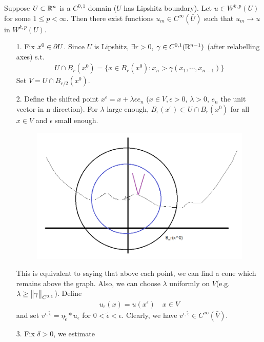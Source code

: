 \documentclass[12pt,a4paper]{report}
\newenvironment{proof}
{\begin{changemargin}{1cm}{0.5cm} 
	}%
	{\end{changemargin}
}
\begin{document}
\thm Suppose $U \subset \mathbb{R}^n$ is a $C^{0,1}$ domain ($U$ has Lipshitz boundary). Let $u\in W^{k,p}(U)$ for some $1\leq p <\infty$. Then there exist functions $u_m \in C^{\infty}(\bar{U})$ such that $u_m \rightarrow u$ in $W^{k,p}(U)$.
\begin{proof}
\pf \begin{itemize}
\item[1.] Fix $x^0 \in \partial U$. Since $U$ is Lipshitz, $\exists r>0$, $\gamma \in C^{0,1}(\mathbb{R}^{n-1})$ (after relabelling axes) s.t.
\begin{align*}
U \cap B_r(x^0) = \{ x\in B_r(x^0) : x_n > \gamma (x_1, \cdots, x_{n-1})\}
\end{align*}
Set $V = U \cap B_{r/2}(x^0)$.
\item[2. ] Define the shifted point $x^{\epsilon} = x+ \lambda \epsilon e_n$ ($x\in V, \epsilon >0$, $\lambda >0$, $e_n$ the unit vector in n-direction). For $\lambda$ large enough, $B_{\epsilon}(x^{\epsilon}) \subset U\cap B_r (x^0)$ for all $x\in V$ and $\epsilon$ small enough.
\begin{figure}[h]
	\centering
	\includegraphics[scale=0.5]{3}
\end{figure}
This is equivalent to saying that above each point, we can find a cone which remains above the graph.  Also, we can choose $\lambda$ uniformly on $V$(e.g. $\lambda \geq \bigl\lVert\gamma\bigr\rVert_{C^{0,1}}$). Define
\begin{align*}
u_{\epsilon}(x) = u(x^{\epsilon}) \quad x\in V
\end{align*}
and set $v^{\epsilon,\tilde{\epsilon}} = \eta_{\tilde{\epsilon}} * u_{\epsilon}$ for $0 < \tilde{\epsilon} <\epsilon$. Clearly, we have $v^{\epsilon, \tilde{\epsilon}} \in C^{\infty}(\bar{V})$.
\item[3.] Fix $\delta >0$, we estimate

\end{itemize}
\end{proof}
\end{document}

